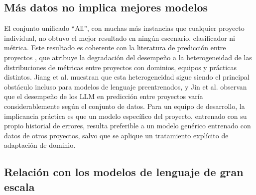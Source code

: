 \subsection{Más datos no implica mejores modelos}

El conjunto unificado ``All'', con muchas más instancias que cualquier proyecto individual, no obtuvo el mejor resultado en ningún escenario, clasificador ni métrica. Este resultado es coherente con la literatura de predicción entre proyectos \cite{cheng2022,sharma2023far}, que atribuye la degradación del desempeño a la heterogeneidad de las distribuciones de métricas entre proyectos con dominios, equipos y prácticas distintos. Jiang et al. \cite{jiang2024} muestran que esta heterogeneidad sigue siendo el principal obstáculo incluso para modelos de lenguaje preentrenados, y Jin et al. \cite{jin2025llm4sdp} observan que el desempeño de los LLM en predicción entre proyectos varía considerablemente según el conjunto de datos. Para un equipo de desarrollo, la implicancia práctica es que un modelo específico del proyecto, entrenado con su propio historial de errores, resulta preferible a un modelo genérico entrenado con datos de otros proyectos, salvo que se aplique un tratamiento explícito de adaptación de dominio.

\subsection{Relación con los modelos de lenguaje de gran escala}

